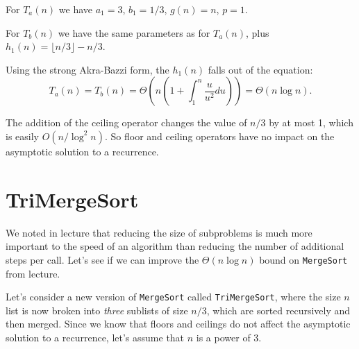 \documentclass[12pt]{article}
\begin{document}
\noindent For $T_a(n)$ we have $a_1 = 3$, $b_1 = 1/3$, $g(n) = n$, $p = 1$.

\noindent For $T_b(n)$ we have the same parameters as for $T_a(n)$, plus $h_1(n) = \lfloor n/3 \rfloor - n/3$. 

Using the strong Akra-Bazzi form, the $h_1(n)$ falls out of the equation:
$$T_a(n) = T_b(n) = \Theta(n(1+ \int_1^n \frac{u}{u^2} du)) = \Theta(n \log n).$$

The addition of the ceiling operator changes the value
of $n/3$ by at most 1, which is easily $O(n / \log^2 n)$.  So floor and
ceiling operators have no impact on the asymptotic solution to a recurrence.



\section{TriMergeSort}

We noted in lecture that reducing the size of subproblems is much more important to the speed of an algorithm than reducing the number of additional steps per call. Let's see if we can improve the $\Theta(n \log n)$ bound on {\tt MergeSort} from lecture.

Let's consider a new version of {\tt MergeSort} called {\tt TriMergeSort}, where the size $n$ list is now broken into \textit{three} sublists of size $n/3$, which are sorted recursively and then merged. Since we know that floors and ceilings do not affect the asymptotic solution to a recurrence, let's assume that $n$ is a power of 3.
\end{document}
